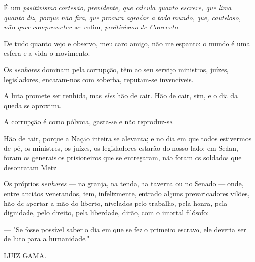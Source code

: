 É um \emph{positivismo cortesão, previdente, que calcula quanto escreve,
que lima quanto diz, porque não fira, que procura agradar a todo mundo,
que, cauteloso, não quer comprometer-se}: enfim, \emph{positivismo de
Convento}.

De tudo quanto vejo e observo, meu caro amigo, não me espanto: o mundo é
uma esfera e a vida o movimento.

Os \emph{senhores} dominam pela corrupção, têm ao seu serviço ministros,
juízes, legisladores, encaram-nos com soberba, reputam-se invencíveis.

A luta promete ser renhida, mas \emph{eles} hão de cair. Hão de cair,
sim, e o dia da queda se aproxima.

A corrupção é como pólvora, gasta-se e não reproduz-se.

Hão de cair, porque a Nação inteira se alevanta; e no dia em que todos
estivermos de pé, os ministros, os juízes, os legisladores estarão do
nosso lado: em Sedan, foram os generais os prisioneiros que se
entregaram, não foram os soldados que desonraram Metz.

Os próprios \emph{senhores} --- na granja, na tenda, na taverna ou no
Senado --- onde, entre anciãos venerandos, tem, infelizmente, entrado
alguns prevaricadores vilões, hão de apertar a mão do liberto, nivelados
pelo trabalho, pela honra, pela dignidade, pelo direito, pela liberdade,
dirão, com o imortal filósofo:

--- "Se fosse possível saber o dia em que se fez o primeiro escravo,
ele deveria ser de luto para a humanidade."

LUIZ GAMA.

\pagebreak
\mbox{}\vfill
\thispagestyle{empty}

